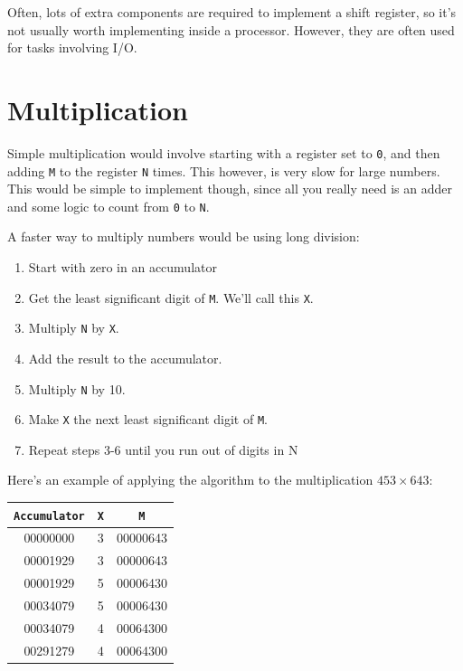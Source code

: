 Often, lots of extra components are required to implement a shift register, so
it's not usually worth implementing inside a processor. However, they are often
used for tasks involving I/O.

\section{Multiplication}

Simple multiplication would involve starting with a register set to {\tt 0}, and
then adding {\tt M} to the register {\tt N} times. This however, is very slow
for large numbers.  This would
be simple to implement though, since all you really need is an adder and some
logic to count from {\tt 0} to {\tt N}.

A faster way to multiply numbers would be using long division:

\begin{enumerate}
	\item Start with zero in an accumulator
	\item Get the least significant digit of {\tt M}. We'll call this {\tt X}.
	\item Multiply {\tt N} by {\tt X}.
	\item Add the result to the accumulator.
	\item Multiply {\tt N} by 10.
	\item Make {\tt X} the next least significant digit of {\tt M}.
	\item Repeat steps 3-6 until you run out of digits in N
\end{enumerate}

Here's an example of applying the algorithm to the multiplication $453 \times
643$:

\begin{center}
	\begin{tabular}{c c c}
		{\tt Accumulator} & {\tt X} & {\tt M}\\ \hline
		00000000 & 3 & 00000643\\
		00001929 & 3 & 00000643\\
		00001929 & 5 & 00006430\\
		00034079 & 5 & 00006430\\
		00034079 & 4 & 00064300\\
		00291279 & 4 & 00064300\\
	\end{tabular}
\end{center}

